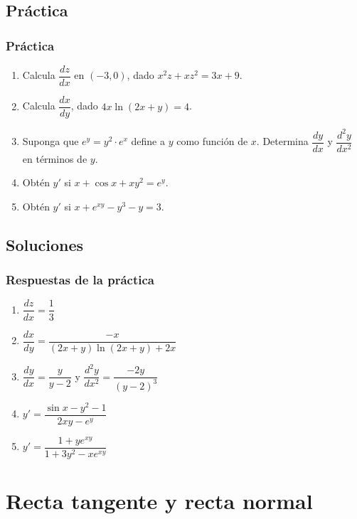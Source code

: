 \documentclass[12pt]{article}
\begin{document}
\subsection{Práctica}

\subsubsection{Práctica}


\begin{enumerate}
    \item Calcula $\dfrac{dz}{dx}$ en $(-3, 0)$, dado $x^2 z + x z^2 = 3x + 9$.
    \item Calcula $\dfrac{dx}{dy}$, dado $4x\ln(2x + y) = 4$.
    \item Suponga que $e^y = y^2 \cdot e^x$ define a $y$ como función de $x$. Determina $\dfrac{dy}{dx}$ y $\dfrac{d^2y}{dx^2}$ en términos de $y$.
    \item Obtén $y'$ si $x + \cos x + xy^2 = e^y$.
    \item Obtén $y'$ si $x + e^{xy} - y^3 - y = 3$.
\end{enumerate}



\subsection{Soluciones}

\subsubsection{Respuestas de la práctica}


\begin{enumerate}
    \item $\dfrac{dz}{dx} = \dfrac{1}{3}$
    \item $\dfrac{dx}{dy} = \dfrac{-x}{(2x + y)\ln(2x + y) + 2x}$
    \item $\dfrac{dy}{dx} = \dfrac{y}{y - 2}$ \quad y \quad $\dfrac{d^2y}{dx^2} = \dfrac{-2y}{(y - 2)^3}$
    \item $y' = \dfrac{\sin x - y^2 - 1}{2xy - e^y}$
    \item $y' = \dfrac{1 + y e^{xy}}{1 + 3y^2 - x e^{xy}}$
\end{enumerate}



\section{Recta tangente y recta normal}
\end{document}
